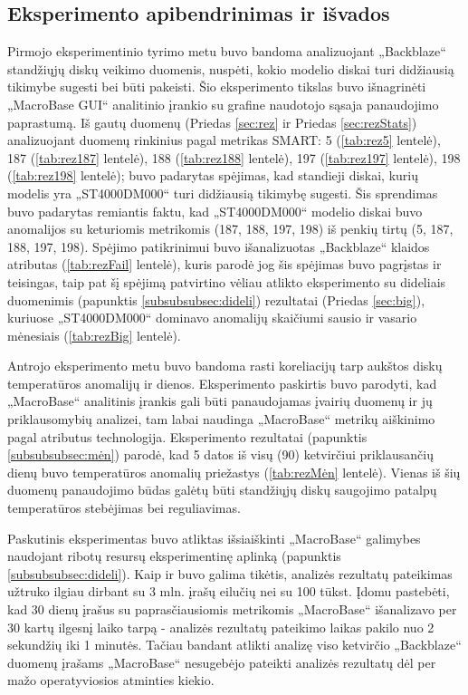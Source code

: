 \documentclass{VUMIFPSkursinis}
\begin{document}
\subsection{Eksperimento apibendrinimas ir išvados} \label{subsec:ExpApibendrinimas}
Pirmojo eksperimentinio tyrimo metu buvo bandoma analizuojant „Backblaze“ standžiųjų diskų veikimo duomenis, nuspėti, kokio modelio diskai turi didžiausią tikimybe sugesti bei būti pakeisti. Šio eksperimento tikslas buvo išnagrinėti „MacroBase GUI“ analitinio įrankio su grafine naudotojo sąsaja panaudojimo paprastumą. Iš gautų duomenų (Priedas \ref{sec:rez} ir Priedas \ref{sec:rezStats}) analizuojant duomenų rinkinius pagal metrikas SMART: 5 (\ref{tab:rez5} lentelė), 187 (\ref{tab:rez187} lentelė), 188 (\ref{tab:rez188} lentelė), 197 (\ref{tab:rez197} lentelė), 198 (\ref{tab:rez198} lentelė); buvo padarytas spėjimas, kad standieji diskai, kurių modelis yra „ST4000DM000“ turi didžiausią tikimybę sugesti. Šis sprendimas buvo padarytas remiantis faktu, kad „ST4000DM000“ modelio diskai buvo anomalijos su keturiomis metrikomis (187, 188, 197, 198) iš penkių tirtų (5, 187, 188, 197, 198). Spėjimo patikrinimui buvo išanalizuotas „Backblaze“ klaidos atributas (\ref{tab:rezFail} lentelė), kuris parodė jog šis spėjimas buvo pagrįstas ir teisingas, taip pat šį spėjimą patvirtino vėliau atlikto eksperimento su dideliais duomenimis (papunktis \ref{subsubsubsec:dideli}) rezultatai (Priedas \ref{sec:big}), kuriuose „ST4000DM000“ dominavo anomalijų skaičiumi sausio ir vasario mėnesiais (\ref{tab:rezBig} lentelė).\par

Antrojo eksperimento metu buvo bandoma rasti koreliacijų tarp aukštos diskų temperatūros anomalijų ir dienos. Eksperimento paskirtis buvo parodyti, kad „MacroBase“ analitinis įrankis gali būti panaudojamas įvairių duomenų ir jų priklausomybių analizei, tam labai naudinga „MacroBase“ metrikų aiškinimo pagal atributus technologija. Eksperimento rezultatai (papunktis \ref{subsubsubsec:mėn}) parodė, kad 5 datos iš visų (90) ketvirčiui priklausančių dienų buvo temperatūros anomalių priežastys (\ref{tab:rezMėn} lentelė). Vienas iš šių duomenų panaudojimo būdas galėtų būti standžiųjų diskų saugojimo patalpų  temperatūros stebėjimas bei reguliavimas. \par

Paskutinis eksperimentas buvo atliktas išsiaiškinti „MacroBase“ galimybes naudojant ribotų resursų eksperimentinę aplinką (papunktis \ref{subsubsubsec:dideli}). Kaip ir buvo galima tikėtis, analizės rezultatų pateikimas užtruko ilgiau dirbant su 3 mln. įrašų eilučių nei su 100 tūkst. Įdomu pastebėti, kad 30 dienų įrašus su paprasčiausiomis metrikomis „MacroBase“ išanalizavo per 30 kartų ilgesnį laiko tarpą - analizės rezultatų pateikimo laikas pakilo nuo 2 sekundžių iki 1 minutės. Tačiau bandant atlikti analizę viso ketvirčio „Backblaze“ duomenų įrašams „MacroBase“ nesugebėjo pateikti analizės rezultatų dėl per mažo operatyviosios atminties kiekio. \par
\end{document}
